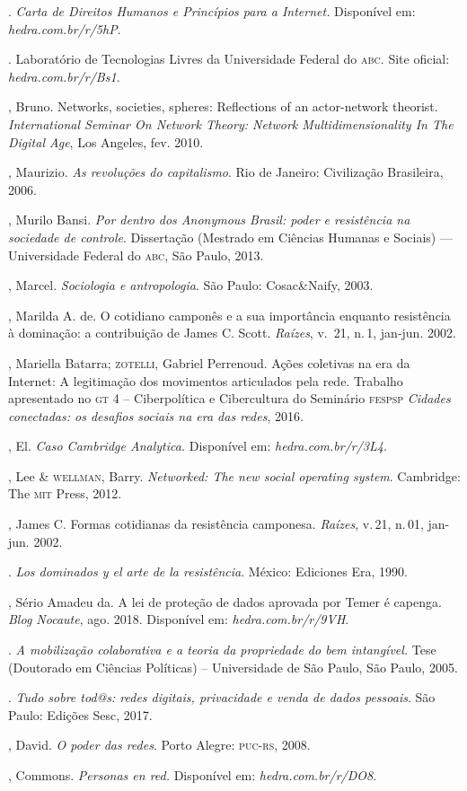 \begin{bibliohedra}
\titidem. \textit{Carta de Direitos Humanos e Princípios para
a Internet.} Disponível em: \textit{hedra.com.br/r/5hP}.

. Laboratório de Tecnologias Livres da
Universidade Federal do \textsc{abc}. Site oficial: \textit{hedra.com.br/r/Bs1}.

, Bruno. Networks, societies, spheres: Reflections of an
actor-network theorist. \textit{International Seminar On Network Theory:
Network Multidimensionality In The Digital Age}, Los Angeles, fev. 2010.

, Maurizio. \textit{As revoluções do capitalismo}. Rio de
Janeiro: Civilização Brasileira, 2006.

, Murilo Bansi. \textit{Por dentro dos Anonymous Brasil: poder e
resistência na sociedade de controle}. Dissertação (Mestrado em Ciências
Humanas e Sociais) --- Universidade Federal do \textsc{abc}, São Paulo, 2013.

, Marcel. \textit{Sociologia e antropologia}. São Paulo: Cosac\&Naify, 2003.

, Marilda A. de. O cotidiano camponês e a sua importância enquanto
resistência à dominação: a contribuição de James C. Scott.
\textit{Raízes}, v.\, 21, n.\,1, jan-jun. 2002.

, Mariella Batarra; \textsc{zotelli}, Gabriel Perrenoud. Ações
coletivas na era da Internet: A legitimação dos movimentos articulados
pela rede. Trabalho apresentado no \textsc{gt} 4 -- Ciberpolítica e Cibercultura
do Seminário \textsc{fespsp} \textit{Cidades conectadas: os desafios sociais na era das
redes}, 2016.

, El. \textit{Caso Cambridge Analytica.} Disponível em: \textit{hedra.com.br/r/3L4}.

, Lee \& \textsc{wellman}, Barry. \textit{Networked: The new social
operating system}. Cambridge: The \textsc{mit} Press, 2012.

, James C. Formas cotidianas da resistência camponesa.
\textit{Raízes}, v.\,21, n.\,01, jan-jun. 2002.

\titidem. \textit{Los dominados y el arte de la resistência}.
México: Ediciones Era, 1990.

, Sério Amadeu da. A lei de proteção de dados aprovada
por Temer é capenga. \textit{Blog Nocaute}, ago. 2018. Disponível em: \textit{hedra.com.br/r/9VH}.

\titidem. \textit{A mobilização colaborativa e a
teoria da propriedade do bem intangível.} Tese (Doutorado em Ciências
Políticas) -- Universidade de São Paulo, São Paulo, 2005.

\titidem. \textit{Tudo sobre tod@s: redes digitais,
privacidade e venda de dados pessoais}. São Paulo: Edições Sesc, 2017.

, David. \textit{O poder das redes}. Porto Alegre: \textsc{puc-rs}, 2008.

, Commons. \textit{Personas en red.} Disponível em: \textit{hedra.com.br/r/DO8}.
\end{bibliohedra}

